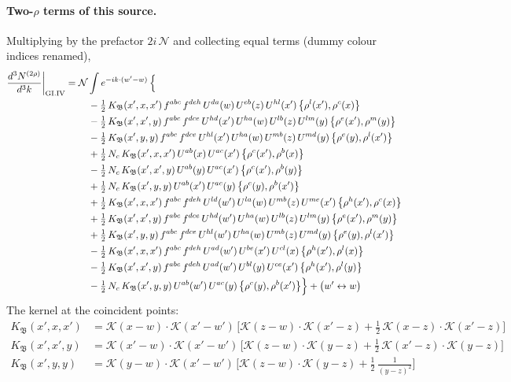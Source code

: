\documentclass[10pt]{article}
\numberwithin{equation}{section}
\newcommand{\KK}{\mathcal K}
\newcommand{\NN}{\mathcal N}
\begin{document}
\paragraph{Two-$\rho$ terms of this source.} Multiplying by the prefactor $2i\,\NN$ and collecting equal terms (dummy colour indices renamed),
\begin{align}
\frac{d^3N^{(2\rho)}}{d^3k}\bigg|_{\rm GI.IV}={}&\NN\int e^{-ik\cdot(w'-w)}\,\Big\{\notag\\
&\quad -\tfrac12\,K_{\mathfrak B}(x',x,x')\,f^{abc}\,f^{deh}\,U^{da}(w)\,U^{eb}(z)\,U^{hl}(x')\,\big\{\rho^{l}(x'),\rho^{c}(x)\big\}\notag\\
&\quad -\tfrac12\,K_{\mathfrak B}(x',x',y)\,f^{abc}\,f^{dce}\,U^{hd}(x')\,U^{ha}(w)\,U^{lb}(z)\,U^{lm}(y)\,\big\{\rho^{e}(x'),\rho^{m}(y)\big\}\notag\\
&\quad -\tfrac12\,K_{\mathfrak B}(x',y,y)\,f^{abc}\,f^{dce}\,U^{hl}(x')\,U^{ha}(w)\,U^{mb}(z)\,U^{md}(y)\,\big\{\rho^{e}(y),\rho^{l}(x')\big\}\notag\\
&\quad +\tfrac12\,N_{c}\,K_{\mathfrak B}(x',x,x')\,U^{ab}(x)\,U^{ac}(x')\,\big\{\rho^{c}(x'),\rho^{b}(x)\big\}\notag\\
&\quad -\tfrac12\,N_{c}\,K_{\mathfrak B}(x',x',y)\,U^{ab}(y)\,U^{ac}(x')\,\big\{\rho^{c}(x'),\rho^{b}(y)\big\}\notag\\
&\quad +\tfrac12\,N_{c}\,K_{\mathfrak B}(x',y,y)\,U^{ab}(x')\,U^{ac}(y)\,\big\{\rho^{c}(y),\rho^{b}(x')\big\}\notag\\
&\quad +\tfrac12\,K_{\mathfrak B}(x',x,x')\,f^{abc}\,f^{deh}\,U^{ld}(w')\,U^{la}(w)\,U^{mb}(z)\,U^{me}(x')\,\big\{\rho^{h}(x'),\rho^{c}(x)\big\}\notag\\
&\quad +\tfrac12\,K_{\mathfrak B}(x',x',y)\,f^{abc}\,f^{dce}\,U^{hd}(w')\,U^{ha}(w)\,U^{lb}(z)\,U^{lm}(y)\,\big\{\rho^{e}(x'),\rho^{m}(y)\big\}\notag\\
&\quad +\tfrac12\,K_{\mathfrak B}(x',y,y)\,f^{abc}\,f^{dce}\,U^{hl}(w')\,U^{ha}(w)\,U^{mb}(z)\,U^{md}(y)\,\big\{\rho^{e}(y),\rho^{l}(x')\big\}\notag\\
&\quad -\tfrac12\,K_{\mathfrak B}(x',x,x')\,f^{abc}\,f^{deh}\,U^{ad}(w')\,U^{be}(x')\,U^{cl}(x)\,\big\{\rho^{h}(x'),\rho^{l}(x)\big\}\notag\\
&\quad -\tfrac12\,K_{\mathfrak B}(x',x',y)\,f^{abc}\,f^{deh}\,U^{ad}(w')\,U^{bl}(y)\,U^{ce}(x')\,\big\{\rho^{h}(x'),\rho^{l}(y)\big\}\notag\\
&\quad -\tfrac12\,N_{c}\,K_{\mathfrak B}(x',y,y)\,U^{ab}(w')\,U^{ac}(y)\,\big\{\rho^{c}(y),\rho^{b}(x')\big\}\Big\}+\big(w'\leftrightarrow w\big)\label{R:eq:res-GI.IV}
\end{align}
The kernel at the coincident points:
\begin{align*}
K_{\mathfrak B}(x',x,x')&=\KK(x-w)\cdot\KK(x'-w')\,\Big[\KK(z-w)\cdot\KK(x'-z)+\tfrac12\,\KK(x-z)\cdot\KK(x'-z)\Big]\\K_{\mathfrak B}(x',x',y)&=\KK(x'-w)\cdot\KK(x'-w')\,\Big[\KK(z-w)\cdot\KK(y-z)+\tfrac12\,\KK(x'-z)\cdot\KK(y-z)\Big]\\K_{\mathfrak B}(x',y,y)&=\KK(y-w)\cdot\KK(x'-w')\,\Big[\KK(z-w)\cdot\KK(y-z)+\tfrac12\,\frac{1}{(y-z)^2}\Big]
\end{align*}
\end{document}
